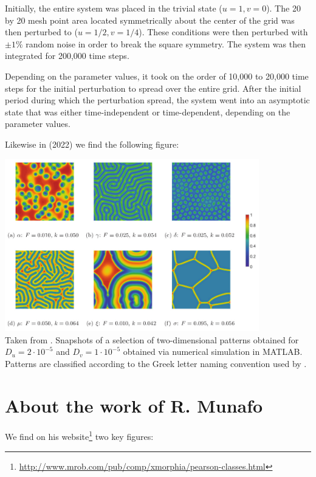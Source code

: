 Initially, the entire system was placed in the trivial state ($u=1,v=0$). The 20 by
20 mesh point area located symmetrically about the center of the grid was then
perturbed to ($u=1/2,v=1/4$). These conditions were then perturbed with $\pm 1\%$
random noise in order to break the square symmetry. The system was then integrated
for 200,000 time steps. 

Depending on the parameter values, it took on the order of 10,000 to
20,000 time steps for the initial perturbation to spread over the entire grid. 
After the initial period during which the perturbation spread, 
the system went into an asymptotic state that was either
time-independent or time-dependent, depending on the parameter values.

Likewise in \textcite{gane22} (2022) we find the following figure:
\begin{center}
\includegraphics[height=7.5cm]{python_codes/fieldstone_171/images/gane22}\\
{\captionfont Taken from \cite{gane22}. 
Snapshots of a selection of two-dimensional patterns obtained for
$D_u=2\cdot 10^{-5}$ and $D_v=1\cdot 10^{-5}$ obtained via numerical 
simulation in MATLAB. Patterns are classified according to the Greek letter 
naming convention used by \textcite{pear93}.
} 
\end{center}

\section*{About the work of R. Munafo}

We find on his website\footnote{\url{http://www.mrob.com/pub/comp/xmorphia/pearson-classes.html}}
two key figures:

